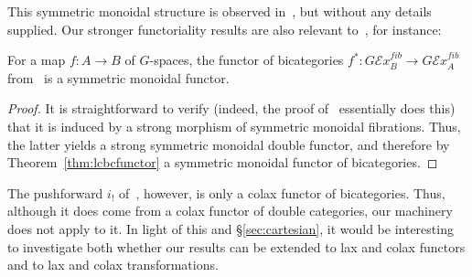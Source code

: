 This symmetric monoidal structure is observed in~\cite[Remark 17.17]{maysig:pht}, but without any details supplied.
Our stronger functoriality results are also relevant to~\cite{maysig:pht}, for instance:

\begin{thm}
  For a map $f:A\to B$ of $G$-spaces, the functor of bicategories $f^*: G\mathcal{E}\mathit{x}^{\mathit{fib}}_B \to G\mathcal{E}\mathit{x}^{\mathit{fib}}_A$ from~\cite[Proposition 19.3.4]{maysig:pht} is a symmetric monoidal functor.
\end{thm}
\begin{proof}
  It is straightforward to verify (indeed, the proof of~\cite[Proposition 19.3.4]{maysig:pht} essentially does this) that it is induced by a strong morphism of symmetric monoidal fibrations.
  Thus, the latter yields a strong symmetric monoidal double functor, and therefore by Theorem~\ref{thm:lcbcfunctor} a symmetric monoidal functor of bicategories.
\end{proof}

The pushforward $i_!$ of~\cite[Proposition 19.3.1]{maysig:pht}, however, is only a colax functor of bicategories.
Thus, although it does come from a colax functor of double categories, our machinery does not apply to it.
In light of this and \S\ref{sec:cartesian}, it would be interesting to investigate both whether our results can be extended to lax and colax functors and to lax and colax transformations.


